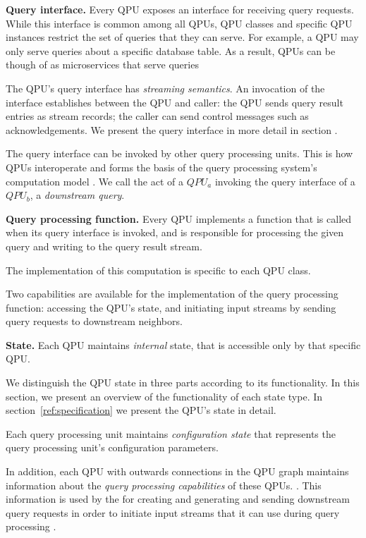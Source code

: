 \medskip
\noindent
\textbf{Query interface.}
Every QPU exposes an interface for receiving query requests.
While this interface is common among all QPUs, QPU classes and specific QPU instances restrict the set of queries
that they can serve.
For example, a QPU may only serve queries about a specific database table.
As a result, QPUs can be though of as microservices that serve queries

The QPU's query interface has \textit{streaming semantics}.
An invocation of the interface establishes between the QPU and caller:
the QPU sends query result entries as stream records; the caller can send control messages such as acknowledgements.
We present the query interface in more detail in section .

The query interface can be invoked by other query processing units.
This is how QPUs interoperate and forms the basis of the query processing system's computation model .
We call the act of a $QPU_a$ invoking the query interface of a $QPU_b$, a \textit{downstream query}.

\medskip
\noindent
\textbf{Query processing function.}
Every QPU implements a function that is called when its query interface is invoked, and is responsible for processing
the given query and writing to the query result stream.

The implementation of this computation is specific to each QPU class.

Two capabilities are available for the implementation of the query processing function:
accessing the QPU's state, and initiating input streams by sending query requests to downstream neighbors.

\medskip
\noindent
\textbf{State.}
Each QPU maintains \textit{internal} state, that is accessible only by that specific QPU.

We distinguish the QPU state in three parts according to its functionality.
In this section, we present an overview of the functionality of each state type.
In section~\ref{ref:specification} we present the QPU's state in detail.

Each query processing unit maintains \textit{configuration state} that represents the query processing unit's
configuration parameters.

In addition, each QPU with outwards connections in the QPU graph maintains information about the
\textit{query processing capabilities} of these QPUs. .
This information is used by the for creating and generating and sending downstream query requests in order to initiate
input streams that it can use during query processing .

